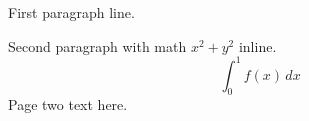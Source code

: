 \documentclass[12pt]{article}
\begin{document}
First paragraph line.

Second paragraph with math $x^2 + y^2$ inline.
\[
  \int_0^1 f(x)\,dx
\]
\newpage
Page two text here.
\end{document}
